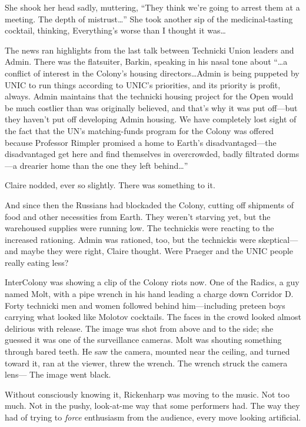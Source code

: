She shook her head sadly, muttering, ``They think we're going to arrest them at a meeting. The depth of mistrust\ldots '' She took another sip of the medicinal-tasting cocktail, thinking, Everything's worse than I thought it was\ldots

The news ran highlights from the last talk between Technicki Union leaders and Admin. There was the flatsuiter, Barkin, speaking in his nasal tone about ``\ldots a conflict of interest in the Colony's housing directors\ldots Admin is being puppeted by UNIC to run things according to UNIC's priorities, and its priority is profit, always. Admin maintains that the technicki housing project for the Open would be much costlier than was originally believed, and that's why it was put off---but they haven't put off developing Admin housing. We have completely lost sight of the fact that the UN's matching-funds program for the Colony was offered because Professor Rimpler promised a home to Earth's disadvantaged---the disadvantaged get here and find themselves in overcrowded, badly filtrated dorms---a drearier home than the one they left behind\ldots ''

Claire nodded, ever so slightly. There was something to it.

And since then the Russians had blockaded the Colony, cutting off shipments of food and other necessities from Earth. They weren't starving yet, but the warehoused supplies were running low. The technickis were reacting to the increased rationing. Admin was rationed, too, but the technickis were skeptical---and maybe they were right, Claire thought. Were Praeger and the UNIC people really eating less?

InterColony was showing a clip of the Colony riots now. One of the Radics, a guy named Molt, with a pipe wrench in his hand leading a charge down Corridor D. Forty technicki men and women followed behind him---including preteen boys carrying what looked like Molotov cocktails. The faces in the crowd looked almost delirious with release. The image was shot from above and to the side; she guessed it was one of the surveillance cameras. Molt was shouting something through bared teeth. He saw the camera, mounted near the ceiling, and turned toward it, ran at the viewer, threw the wrench. The wrench struck the camera lens--- The image went black.

Without consciously knowing it, Rickenharp was moving to the music. Not too much. Not in the pushy, look-at-me way that some performers had. The way they had of trying to \textit{force} enthusiasm from the audience, every move looking artificial.

